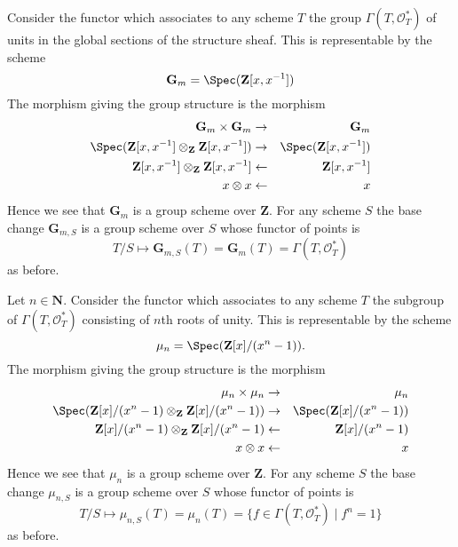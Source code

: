 \begin{example}
\label{example-multiplicative-group}
Consider the functor which associates
to any scheme $T$ the group $\Gamma(T, \mathcal{O}_T^*)$
of units in the global sections of the structure sheaf.
This is representable by the scheme
$$
\mathbf{G}_m = \Spec(\mathbf{Z}[x, x^{-1}])
$$
The morphism giving the group structure is the morphism
\begin{eqnarray*}
\mathbf{G}_m \times \mathbf{G}_m & \to & \mathbf{G}_m \\
\Spec(\mathbf{Z}[x, x^{-1}] \otimes_{\mathbf{Z}} \mathbf{Z}[x, x^{-1}])
& \to &
\Spec(\mathbf{Z}[x, x^{-1}]) \\
\mathbf{Z}[x, x^{-1}] \otimes_{\mathbf{Z}} \mathbf{Z}[x, x^{-1}]
& \leftarrow &
\mathbf{Z}[x, x^{-1}] \\
x \otimes x & \leftarrow & x
\end{eqnarray*}
Hence we see that $\mathbf{G}_m$ is a group scheme over $\mathbf{Z}$.
For any scheme $S$ the base change $\mathbf{G}_{m, S}$ is a
group scheme over $S$ whose functor of points is
$$
T/S
\longmapsto
\mathbf{G}_{m, S}(T) = \mathbf{G}_m(T) = \Gamma(T, \mathcal{O}_T^*)
$$
as before.
\end{example}

\begin{example}
\label{example-roots-of-unity}
Let $n \in \mathbf{N}$.
Consider the functor which associates
to any scheme $T$ the subgroup of $\Gamma(T, \mathcal{O}_T^*)$
consisting of $n$th roots of unity.
This is representable by the scheme
$$
\mu_n = \Spec(\mathbf{Z}[x]/(x^n - 1)).
$$
The morphism giving the group structure is the morphism
\begin{eqnarray*}
\mu_n \times \mu_n & \to & \mu_n \\
\Spec(
\mathbf{Z}[x]/(x^n - 1)
\otimes_{\mathbf{Z}}
\mathbf{Z}[x]/(x^n - 1))
& \to &
\Spec(\mathbf{Z}[x]/(x^n - 1)) \\
\mathbf{Z}[x]/(x^n - 1) \otimes_{\mathbf{Z}} \mathbf{Z}[x]/(x^n - 1)
& \leftarrow &
\mathbf{Z}[x]/(x^n - 1) \\
x \otimes x & \leftarrow & x
\end{eqnarray*}
Hence we see that $\mu_n$ is a group scheme over $\mathbf{Z}$.
For any scheme $S$ the base change $\mu_{n, S}$ is a
group scheme over $S$ whose functor of points is
$$
T/S
\longmapsto
\mu_{n, S}(T) = \mu_n(T) = \{f \in \Gamma(T, \mathcal{O}_T^*) \mid f^n = 1\}
$$
as before.
\end{example}


